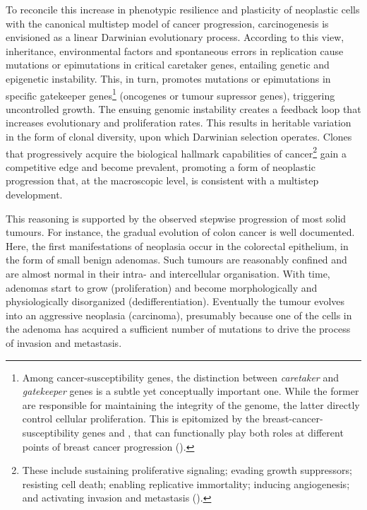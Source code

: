 To reconcile this increase in phenotypic resilience and plasticity of neoplastic
cells with the canonical multistep model of cancer
progression,\cite{land_cellular_1983,vogelstein_multistep_1993} carcinogenesis
is envisioned as a linear Darwinian evolutionary
process.\cite{merlo_cancer_2006,polyak_tumor_2014} According to this
view,\cite{podlaha_evolution_2012} inheritance, environmental factors and
spontaneous errors in  replication cause mutations or
epimutations in critical caretaker genes, entailing genetic and epigenetic
instability.  This, in turn, promotes mutations or epimutations in specific
gatekeeper genes\footnote{Among \mbox{cancer-susceptibility} genes, the
  distinction between \emph{caretaker} and \emph{gatekeeper} genes is a subtle
  yet conceptually important one.  While the former are responsible for
  maintaining the integrity of the genome, the latter directly control cellular
  proliferation.  This is epitomized by the \mbox{breast-cancer-susceptibility}
  genes  and , that can
  functionally play both roles at different points of breast cancer progression
  (\citealp{kinzler_gatekeepers_1997}).}  (oncogenes or tumour supressor genes),
triggering uncontrolled growth.  The ensuing genomic instability creates a
feedback loop that increases evolutionary and proliferation
rates.\cite{sieber_genomic_2003} This results in heritable variation in the form
of clonal diversity, upon which Darwinian selection operates.  Clones that
progressively acquire the biological hallmark capabilities of
cancer\footnote{These include sustaining proliferative signaling; evading growth
  suppressors; resisting cell death; enabling replicative immortality; inducing
  angiogenesis; and activating invasion and metastasis
  (\citealp{hanahan_hallmarks_2011}).} gain a competitive edge and become
prevalent, promoting a form of neoplastic progression that, at the macroscopic
level, is consistent with a multistep development.


This reasoning is supported by the observed \mbox{stepwise} progression of most
solid tumours.  For instance, the gradual evolution of colon cancer is well
documented.\cite{vogelstein_multistep_1993} Here, the first manifestations of
neoplasia occur in the colorectal epithelium, in the form of small benign
adenomas.  Such tumours are reasonably confined and are almost normal in their
intra- and intercellular organisation.  With time, adenomas start to grow
(proliferation) and become morphologically and physiologically disorganized
(dedifferentiation).  Eventually the tumour evolves into an aggressive neoplasia
(carcinoma), presumably because one of the cells in the adenoma has acquired a
sufficient number of mutations to drive the process of invasion and metastasis.

